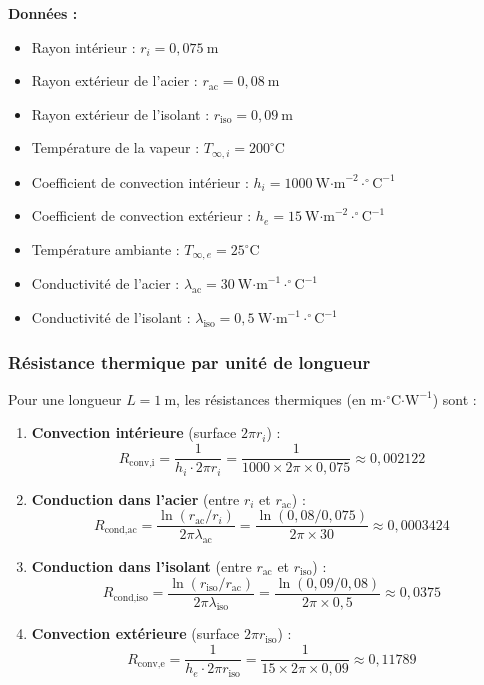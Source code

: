 \documentclass[12pt,a4paper]{article}
\begin{document}
\textbf{Données :}
\begin{itemize}
    \item Rayon intérieur : \(r_i = 0,075\ \text{m}\)
    \item Rayon extérieur de l'acier : \(r_{\text{ac}} = 0,08\ \text{m}\)
    \item Rayon extérieur de l'isolant : \(r_{\text{iso}} = 0,09\ \text{m}\)
    \item Température de la vapeur : \(T_{\infty,i} = 200^\circ \text{C}\)
    \item Coefficient de convection intérieur : \(h_i = 1000\ \text{W·m}^{-2}\cdot^\circ\text{C}^{-1}\)
    \item Coefficient de convection extérieur : \(h_e = 15\ \text{W·m}^{-2}\cdot^\circ\text{C}^{-1}\)
    \item Température ambiante : \(T_{\infty,e} = 25^\circ \text{C}\)
    \item Conductivité de l'acier : \(\lambda_{\text{ac}} = 30\ \text{W·m}^{-1}\cdot^\circ\text{C}^{-1}\)
    \item Conductivité de l'isolant : \(\lambda_{\text{iso}} = 0,5\ \text{W·m}^{-1}\cdot^\circ\text{C}^{-1}\)
\end{itemize}

\subsubsection*{Résistance thermique par unité de longueur}
Pour une longueur \(L = 1\ \text{m}\), les résistances thermiques (en \(\text{m·}^\circ\text{C·W}^{-1}\)) sont :

\begin{enumerate}
    \item \textbf{Convection intérieure} (surface \(2\pi r_i\)) :
    \[
    R_{\text{conv,i}} = \frac{1}{h_i \cdot 2\pi r_i} = \frac{1}{1000 \times 2\pi \times 0,075} \approx 0,002122
    \]
    
    \item \textbf{Conduction dans l'acier} (entre \(r_i\) et \(r_{\text{ac}}\)) :
    \[
    R_{\text{cond,ac}} = \frac{\ln(r_{\text{ac}} / r_i)}{2\pi \lambda_{\text{ac}}} = \frac{\ln(0,08 / 0,075)}{2\pi \times 30} \approx 0,0003424
    \]
    
    \item \textbf{Conduction dans l'isolant} (entre \(r_{\text{ac}}\) et \(r_{\text{iso}}\)) :
    \[
    R_{\text{cond,iso}} = \frac{\ln(r_{\text{iso}} / r_{\text{ac}})}{2\pi \lambda_{\text{iso}}} = \frac{\ln(0,09 / 0,08)}{2\pi \times 0,5} \approx 0,0375
    \]
    
    \item \textbf{Convection extérieure} (surface \(2\pi r_{\text{iso}}\)) :
    \[
    R_{\text{conv,e}} = \frac{1}{h_e \cdot 2\pi r_{\text{iso}}} = \frac{1}{15 \times 2\pi \times 0,09} \approx 0,11789
    \]
\end{enumerate}
\end{document}
